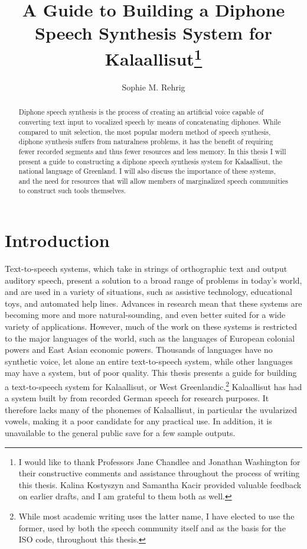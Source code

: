 \documentclass[12pt]{article}
\title{\vspace{-2cm}A Guide to Building a Diphone Speech Synthesis System for Kalaallisut\thanks{I would like to thank Professors Jane Chandlee and Jonathan Washington for their constructive comments and assistance throughout the process of writing this thesis. Kalina Kostyszyn and Samantha Kacir provided valuable feedback on earlier drafts, and I am grateful to them both as well.}}
\author{Sophie M. Rehrig}
\date{{\small\parbox{\linewidth}{\centering
A thesis submitted in partial fulfillment of the requirements for the degree of Bachelor of Arts in Linguistics\endgraf\bigskip
Bryn Mawr College \endgraf
December 2016}}}
\begin{document}
\maketitle
\thispagestyle{empty}

\begin{abstract}
Diphone speech synthesis is the process of creating an artificial voice capable of converting text input to vocalized speech by means of concatenating diphones. While compared to unit selection, the most popular modern method of speech synthesis, diphone synthesis suffers from naturalness problems, it has the benefit of requiring fewer recorded segments and thus fewer resources and less memory. In this thesis I will present a guide to constructing a diphone speech synthesis system for Kalaallisut, the national language of Greenland. I will also discuss the importance of these systems, and the need for resources that will allow members of marginalized speech communities to construct such tools themselves. \par
\end{abstract}

\clearpage
\newpage

\singlespacing
\tableofcontents
\doublespacing

\newpage

\section{Introduction}

Text-to-speech systems, which take in strings of orthographic text and output auditory speech, present a solution to a broad range of problems in today's world, and are used in a variety of situations, such as assistive technology, educational toys, and automated help lines. Advances in research mean that these systems are becoming more and more natural-sounding, and even better suited for a wide variety of applications. However, much of the work on these systems is restricted to the major languages of the world, such as the languages of European colonial powers and East Asian economic powers. Thousands of languages have no synthetic voice, let alone an entire text-to-speech system, while other languages may have a system, but of poor quality. This thesis presents a guide for building a text-to-speech system for Kalaallisut, or West Greenlandic.\footnote{While most academic writing uses the latter name, I have elected to use the former, used by both the speech community itself and as the basis for the ISO code, throughout this thesis.} Kalaallisut has had a system built by \citet{de_speech} from recorded German speech for research purposes. It therefore lacks many of the phonemes of Kalaallisut, in particular the uvularized vowels, making it a poor candidate for any practical use. In addition, it is unavailable to the general public save for a few sample outputs. \par
\end{document}
